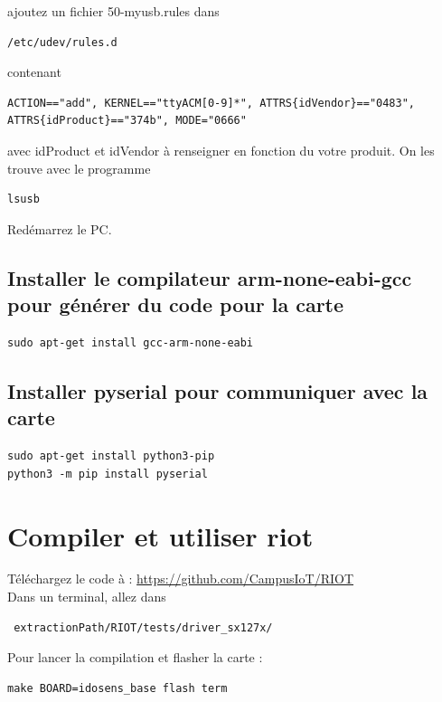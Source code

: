 \documentclass{article}
\begin{document}
ajoutez un fichier 50-myusb.rules dans 

\begin{verbatim}
/etc/udev/rules.d

\end{verbatim}
contenant 

\begin{verbatim}
ACTION=="add", KERNEL=="ttyACM[0-9]*", ATTRS{idVendor}=="0483",
ATTRS{idProduct}=="374b", MODE="0666"

\end{verbatim}

avec idProduct et idVendor à renseigner en fonction du votre produit. On les trouve avec le programme

\begin{verbatim}
lsusb

\end{verbatim}
Redémarrez le PC.
\subsection{Installer le compilateur arm-none-eabi-gcc pour générer du code pour la carte}

\begin{verbatim}
sudo apt-get install gcc-arm-none-eabi

\end{verbatim}


\subsection{Installer pyserial pour communiquer avec la carte}

\begin{verbatim}
sudo apt-get install python3-pip
python3 -m pip install pyserial
\end{verbatim}

\section{Compiler et utiliser riot}


Téléchargez le code à : \url{https://github.com/CampusIoT/RIOT}\\
Dans un terminal, allez dans 

\begin{verbatim}
 extractionPath/RIOT/tests/driver_sx127x/
\end{verbatim}



Pour lancer la compilation et flasher la carte :
\begin{verbatim}
make BOARD=idosens_base flash term
\end{verbatim}
\end{document}
